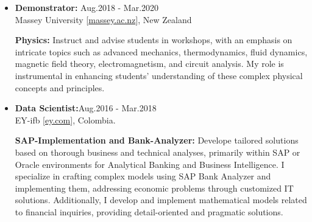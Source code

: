 \begin{itemize}
    \item {\bf Demonstrator:} \hfill \textcolor{my_blue}{Aug.2018 - Mar.2020}\\
          Massey University [\href{www.massey.ac.nz}{massey.ac.nz}],
          New Zealand

              {\noindent
                  \textbf{Physics:}
                  Instruct and advise students in workshops, with an emphasis on intricate topics such as advanced mechanics, thermodynamics, fluid dynamics, magnetic field theory, electromagnetism, and circuit analysis. My role is instrumental in enhancing students' understanding of these complex physical concepts and principles.
              }



    \item {\bf Data Scientist:}\hfill \textcolor{my_blue}{Aug.2016 - Mar.2018}\\
          EY-ifb [\href{www.ey.com/en\_gl/ey-ifb}{ey.com}],
          Colombia.

              {\noindent
                  \textbf{SAP-Implementation and Bank-Analyzer:}
                  Develope tailored solutions based on thorough business and technical analyses, primarily within SAP or Oracle environments for Analytical Banking and Business Intelligence. I specialize in crafting complex models using SAP Bank Analyzer and implementing them, addressing economic problems through customized IT solutions. Additionally, I develop and implement mathematical models related to financial inquiries, providing detail-oriented and pragmatic solutions.
              }


\end{itemize}
